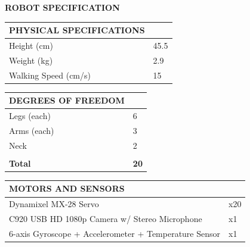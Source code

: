 \documentclass[10pt,a4paper]{article}
\begin{document}
\begin{center}
	\colorbox[rgb]{0.0, 0.0, 0.0}
	{
	\begin{minipage}[c][3em][c]{\textwidth}
		{\color{textcolour}
			{
			\begin{Large}
				\textbf{ROBOT SPECIFICATION}
			\end{Large}
			}
		}
	\end{minipage}
	}
\end{center}

\begin{multicols}{2}
\begin{table}[H]
	\begin{tabular}{|m{5.7cm}|m{1.15cm}|}
		\hline
		\rowcolor[rgb]{0.0, 0.0, 0.0}
		{\color{textcolour}\textbf{{PHYSICAL SPECIFICATIONS}}} & \\
		\hline
		Height (cm) & 45.5 \\
		\hline
		Weight (kg) & 2.9 \\
		\hline
		Walking Speed (cm/s) & 15 \\
		\hline
	\end{tabular}
\end{table}

\begin{table}[H]
	\begin{tabular}{|m{5.7cm}|m{1.15cm}|}
		\hline
		\rowcolor[rgb]{0.0, 0.0, 0.0}
		{\color{textcolour}\textbf{{DEGREES OF FREEDOM}}} & \\
		\hline
		Legs (each) & 6 \\
		\hline
		Arms (each) & 3 \\
		\hline
		Neck & 2 \\
		\hline
		& \\
		\hline
		\textbf{Total} & \textbf{20} \\
		\hline
	\end{tabular}
\end{table}

\begin{table}[H]
	\begin{tabular}{|m{5.7cm}|m{1.15cm}|}
		\hline
		\rowcolor[rgb]{0.0, 0.0, 0.0}
		{\color{textcolour}\textbf{{MOTORS AND SENSORS}}} & \\
		\hline
		Dynamixel MX-28 Servo & x20 \\
		\hline
		C920 USB HD 1080p Camera w/ Stereo Microphone & x1 \\
		\hline
		6-axis Gyroscope + Accelerometer + Temperature Sensor & x1 \\
		\hline
	\end{tabular}
\end{table}


\end{multicols}
\end{document}
